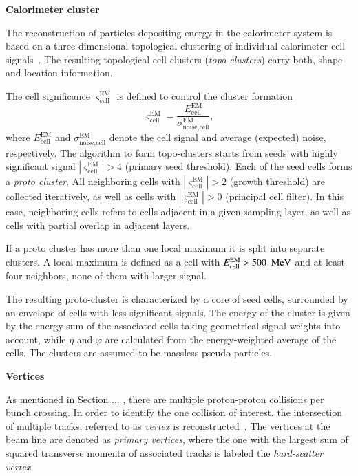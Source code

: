 \vspace{.5cm}
\noindent
\textbf{Calorimeter cluster}
\vspace{.5cm}

\noindent
The reconstruction of particles depositing energy in the calorimeter system is 
based on a three-dimensional topological clustering of individual calorimeter cell signals~\cite{PERF-2014-07}.
The resulting topological cell clusters (\textit{topo-clusters}) carry both, shape and location information.

The cell significance $\varsigma^\text{EM}_\text{cell}$ is defined to control the 
cluster formation
\begin{equation}
    \varsigma^\text{EM}_\text{cell} = \frac{E^\text{EM}_\text{cell}}{\sigma^\text{EM}_\text{noise,cell}}
    \label{eq:ObjReco:topo_threshold},
\end{equation}
where $E^\text{EM}_\text{cell}$ and $\sigma^\text{EM}_\text{noise,cell}$
denote the cell signal and average (expected) noise, respectively.
The algorithm to form topo-clusters starts from seeds with highly significant signal
$|\varsigma^\text{EM}_\text{cell}|>4$ (primary seed threshold). Each of the seed cells forms a \textit{proto cluster}.
All neighboring cells with $|\varsigma^\text{EM}_\text{cell}|>2$ (growth threshold) are collected
iteratively, as well as cells with $|\varsigma^\text{EM}_\text{cell}|>0$ (principal cell filter).
In this case, neighboring cells refers to cells adjacent in
a given sampling layer, as well as cells with partial overlap in adjacent layers.

If a proto cluster has more than one local maximum it is split into separate clusters.
A local maximum is defined as a cell with $E^\text{EM}_\text{cell} > 500~~\text{MeV}$
and at least four neighbors, none of them with larger signal.

The resulting proto-cluster is characterized by a core of
seed cells, surrounded by an envelope of cells with less significant signals.
The energy of the cluster is given by the energy sum of the associated cells taking geometrical signal weights into account,
while $\eta$ and $\varphi$ are calculated from the energy-weighted average of the cells. The clusters are assumed to be massless pseudo-particles.

\vspace{.5cm}
\noindent
\textbf{Vertices}
\vspace{.5cm}

\noindent
As mentioned in Section ... , there are multiple proton-proton collisions per bunch crossing.
In order to identify the one collision of interest, the intersection of multiple tracks, referred to as \textit{vertex} is reconstructed~\cite{ATL-PHYS-PUB-2015-026}.
The vertices at the beam line are denoted as \textit{primary vertices}, where the one with the largest sum of squared transverse momenta of associated tracks is labeled the \textit{hard-scatter vertex}.

